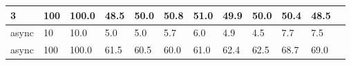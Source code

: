 \documentclass[a4paper]{report}
\begin{document}
\begin{table}[h]
\begin{tabular}{|l|l|l|l|l|l|l|l|l|l|l|l|}
		3                        & 100                                & 100.0                           & 48.5                        & 50.0                      & 50.8                           & 51.0   & 49.9 & 50.0   & 50.4 & 48.5   \\ \hline
		async                    & 10                                 & 10.0                            & 5.0                         & 5.0                       & 5.7                            & 6.0    & 4.9  & 4.5    & 7.7  & 7.5    \\ \hline
		async                    & 100                                & 100.0                           & 61.5                        & 60.5                      & 60.0                           & 61.0   & 62.4 & 62.5   & 68.7 & 69.0   \\ \hline
	\end{tabular}
\end{table}
\end{document}
